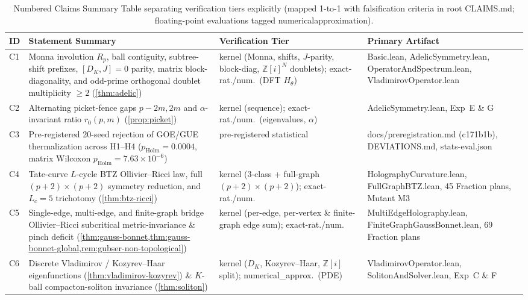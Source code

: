\documentclass[11pt,a4paper]{article}
\numberwithin{equation}{section}
\theoremstyle{plain}
\theoremstyle{definition}
\theoremstyle{remark}
\newcommand{\Z}{\mathbb{Z}}
\newcommand{\code}[1]{{\ttfamily\footnotesize\def\_{\textunderscore\penalty0\hskip0pt}#1}}
\begin{document}
\begin{table}[ht]
\centering
\caption{Numbered Claims Summary Table separating verification tiers explicitly (mapped 1-to-1 with falsification criteria in root \code{CLAIMS.md}; floating-point evaluations tagged \code{numerical\_approximation}).}
\label{tab:claims}
\footnotesize
\setlength{\tabcolsep}{3.2pt}
\begin{tabular}{@{}l>{\raggedright\arraybackslash}p{5.0cm}>{\raggedright\arraybackslash}p{3.1cm}>{\raggedright\arraybackslash}p{4.3cm}@{}}
\toprule
ID & Statement Summary & Verification Tier & Primary Artifact \\
\midrule
C1 & Monna involution $R_p$, ball contiguity, subtree-shift prefixes, $[D_K,J]=0$ parity, matrix block-diagonality, and odd-prime orthogonal doublet multiplicity $\ge 2$ (\cref{thm:adelic}) & kernel (Monna, shifts, $J$-parity, block-diag, $\Z[i]^N$ doublets); exact-rat./num.\ (DFT $H_\theta$) & \code{Basic.lean}, \code{Adelic\allowbreak Symmetry.lean}, \code{OperatorAnd\allowbreak Spectrum.lean}, \code{Vladimirov\allowbreak Operator.lean} \\
C2 & Alternating picket-fence gaps $p-2m, 2m$ and $\alpha$-invariant ratio $r_0(p,m)$ (\cref{prop:picket}) & kernel (sequence); exact-rat./num.\ (eigenvalues, $\alpha$) & \code{AdelicSymmetry.lean}, Exp~E \& G \\
C3 & Pre-registered 20-seed rejection of GOE/GUE thermalization across H1--H4 ($p_{\mathrm{Holm}} = 0.0004$, matrix Wilcoxon $p_{\mathrm{Holm}} = 7.63\times 10^{-6}$) & pre-registered statistical & \code{docs/preregistration.md} (\code{c171b1b}), \code{DEVIATIONS.md}, \code{stats-eval.json} \\
C4 & Tate-curve $L$-cycle BTZ Ollivier--Ricci law, full $(p+2)\times(p+2)$ symmetry reduction, and $L_c = 5$ trichotomy (\cref{thm:btz-ricci}) & kernel (3-class + full-graph $(p+2)\times(p+2)$); exact-rat./num. & \code{Holography\allowbreak Curvature.lean}, \code{FullGraphBTZ.lean}, 45 \code{Fraction} plans, Mutant M3 \\
C5 & Single-edge, multi-edge, and finite-graph bridge Ollivier--Ricci subcritical metric-invariance \& pinch deficit (\cref{thm:gauss-bonnet,thm:gauss-bonnet-global,rem:gubser-non-topological}) & kernel (per-edge, per-vertex \& finite-graph edge sum); exact-rat./num. & \code{MultiEdge\allowbreak Holography.lean}, \code{FiniteGraph\allowbreak GaussBonnet.lean}, 69 \code{Fraction} plans \\
C6 & Discrete Vladimirov / Kozyrev--Haar eigenfunctions (\cref{thm:vladimirov-kozyrev}) \& $K$-ball compacton-soliton invariance (\cref{thm:soliton}) & kernel ($D_K$, Kozyrev--Haar, $\Z[i]$ split); numerical\_\allowbreak approx.\ (PDE) & \code{Vladimirov\allowbreak Operator.lean}, \code{SolitonAnd\allowbreak Solver.lean}, Exp~C \& F \\

\end{tabular}
\end{table}
\end{document}
